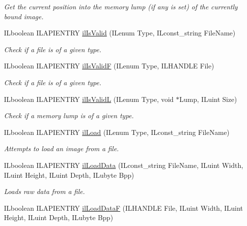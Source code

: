 \begin{DoxyCompactItemize}
\begin{DoxyCompactList}\small\item\em Get the current position into the memory lump (if any is set) of the currently bound image. \end{DoxyCompactList}\item 
I\+Lboolean I\+L\+A\+P\+I\+E\+N\+T\+R\+Y \hyperlink{group__file_ga41b3e8904b94c4b4956a99cdaeda99ae}{il\+Is\+Valid} (I\+Lenum Type, I\+Lconst\+\_\+string File\+Name)
\begin{DoxyCompactList}\small\item\em Check if a file is of a given type. \end{DoxyCompactList}\item 
I\+Lboolean I\+L\+A\+P\+I\+E\+N\+T\+R\+Y \hyperlink{group__file_ga758c5fd4ff61cd47530442cfac50f4c3}{il\+Is\+Valid\+F} (I\+Lenum Type, I\+L\+H\+A\+N\+D\+L\+E File)
\begin{DoxyCompactList}\small\item\em Check if a file is of a given type. \end{DoxyCompactList}\item 
I\+Lboolean I\+L\+A\+P\+I\+E\+N\+T\+R\+Y \hyperlink{group__file_ga6ab6e9cdafb45c65570c5ed5eb0fde57}{il\+Is\+Valid\+L} (I\+Lenum Type, void $\ast$Lump, I\+Luint Size)
\begin{DoxyCompactList}\small\item\em Check if a memory lump is of a given type. \end{DoxyCompactList}\item 
I\+Lboolean I\+L\+A\+P\+I\+E\+N\+T\+R\+Y \hyperlink{group__file_ga9972544062275b0cf8f41acef375d88f}{il\+Load} (I\+Lenum Type, I\+Lconst\+\_\+string File\+Name)
\begin{DoxyCompactList}\small\item\em Attempts to load an image from a file. \end{DoxyCompactList}\item 
\hypertarget{group__file_gaf39ed11daf8c151dff75be87afacdfca}{I\+Lboolean I\+L\+A\+P\+I\+E\+N\+T\+R\+Y \hyperlink{group__file_gaf39ed11daf8c151dff75be87afacdfca}{il\+Load\+Data} (I\+Lconst\+\_\+string File\+Name, I\+Luint Width, I\+Luint Height, I\+Luint Depth, I\+Lubyte Bpp)}\label{group__file_gaf39ed11daf8c151dff75be87afacdfca}

\begin{DoxyCompactList}\small\item\em Loads raw data from a file. \end{DoxyCompactList}\item 
\hypertarget{group__file_ga50049c04c459b921cafcdd7b837ac8ee}{I\+Lboolean I\+L\+A\+P\+I\+E\+N\+T\+R\+Y \hyperlink{group__file_ga50049c04c459b921cafcdd7b837ac8ee}{il\+Load\+Data\+F} (I\+L\+H\+A\+N\+D\+L\+E File, I\+Luint Width, I\+Luint Height, I\+Luint Depth, I\+Lubyte Bpp)}\label{group__file_ga50049c04c459b921cafcdd7b837ac8ee}


\end{DoxyCompactItemize}
